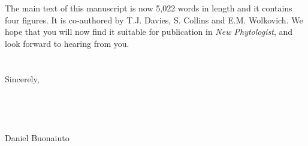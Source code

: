 \documentclass{article}[12pt]
\begin{document}
The main text of this manuscript is now 5,022 words in length and it contains four figures. It is co-authored by T.J. Davies, S. Collins and E.M. Wolkovich. We hope that you will now find it suitable for publication in \emph{New Phytologist}, and look forward to hearing from you.\\\\\\
Sincerely,\\\\\\\\\\
\noindent Daniel Buonaiuto\\

 
\end{document}

